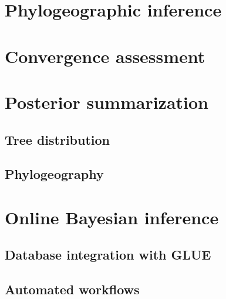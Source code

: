 \section{Phylogeographic inference}

\section{Convergence assessment}

\section{Posterior summarization}

\subsection{Tree distribution}

\subsection{Phylogeography}

\section{Online Bayesian inference}

\subsection{Database integration with GLUE}

\subsection{Automated workflows}



\cleardoublepage


